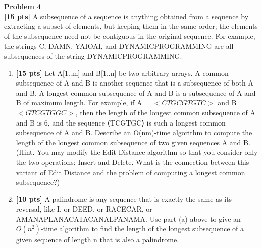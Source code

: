\documentclass{article}
\newenvironment{problem}[2][Problem]
    { \begin{mdframed}[backgroundcolor=gray!20] \textbf{#1 #2} \\}
    {  \end{mdframed}}
\begin{document}
\newpage
\begin{problem}{4}
\textbf{[15 pts]} 
A subsequence of a sequence is anything obtained from a sequence by extracting a subset of elements, but keeping them in the same order; the elements of the subsequence need not be contiguous in the original sequence. For example, the strings C, DAMN, YAIOAI, and DYNAMICPROGRAMMING are all subsequences of the string DYNAMICPROGRAMMING.
\begin{enumerate}
	\item\textbf{[15 pts]}  Let A[1..m] and B[1..n] be two arbitrary arrays. A common subsequence of A and B is another sequence that is a subsequence of both A and B. A longest common subsequence of A and B is a subsequence of A and B of maximum length. For example, if A = $<CTGCGTGTC>$ and B = $<GTCGTGGC>$, then the length of the longest common subsequence of A and B is 6, and the sequence ⟨TCGTGC⟩ is such a longest common subsequence of A and B. Describe an O(nm)-time algorithm to compute the length of the longest common subsequence of two given sequences A and B. (Hint. You may modify the Edit Distance algorithm so that you consider only the two operations: Insert and Delete. What is the connection between this variant of Edit Distance and the problem of computing a longest common subsequence?)
	\item\textbf{[10 pts]} A palindrome is any sequence that is exactly the same as its reversal, like I, or DEED, or RACECAR, or AMANAPLANACATACANALPANAMA. Use part (a) above to give an $O(n^2)$-time algorithm to find the length of the longest subsequence of a given sequence of length n that is also a palindrome.
\end{enumerate}
\end{problem}
\end{document}
